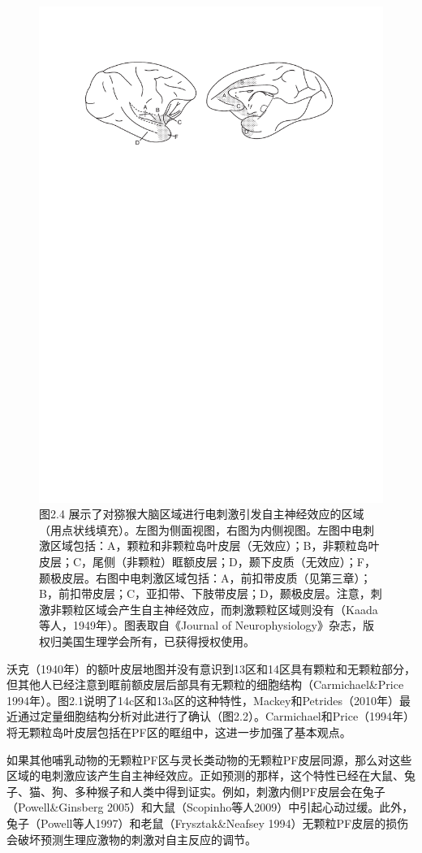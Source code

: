 \begin{figure}[!htb]
	\centering
	\includegraphics[width=0.8\linewidth]{image_pfc/Fig_2_4}
	\caption*{图2.4 展示了对猕猴大脑区域进行电刺激引发自主神经效应的区域（用点状线填充）。左图为侧面视图，右图为内侧视图。左图中电刺激区域包括：A，颗粒和非颗粒岛叶皮层（无效应）；B，非颗粒岛叶皮层；C，尾侧（非颗粒）眶额皮层；D，颞下皮质（无效应）；F，颞极皮层。右图中电刺激区域包括：A，前扣带皮质（见第三章）；B，前扣带皮层；C，亚扣带、下肢带皮层；D，颞极皮层。注意，刺激非颗粒区域会产生自主神经效应，而刺激颗粒区域则没有（Kaada等人，1949年）。图表取自《Journal of  Neurophysiology》杂志，版权归美国生理学会所有，已获得授权使用。}
\end{figure}

沃克（1940年）的额叶皮层地图并没有意识到13区和14区具有颗粒和无颗粒部分，但其他人已经注意到眶前额皮层后部具有无颗粒的细胞结构（Carmichael\&Price 1994年）。图2.1说明了14c区和13a区的这种特性，Mackey和Petrides（2010年）最近通过定量细胞结构分析对此进行了确认（图2.2）。Carmichael和Price（1994年）将无颗粒岛叶皮层包括在PF区的眶组中，这进一步加强了基本观点。

如果其他哺乳动物的无颗粒PF区与灵长类动物的无颗粒PF皮层同源，那么对这些区域的电刺激应该产生自主神经效应。正如预测的那样，这个特性已经在大鼠、兔子、猫、狗、多种猴子和人类中得到证实。例如，刺激内侧PF皮层会在兔子（Powell\&Ginsberg 2005）和大鼠（Scopinho等人2009）中引起心动过缓。此外，兔子（Powell等人1997）和老鼠（Frysztak\&Neafsey 1994）无颗粒PF皮层的损伤会破坏预测生理应激物的刺激对自主反应的调节。

